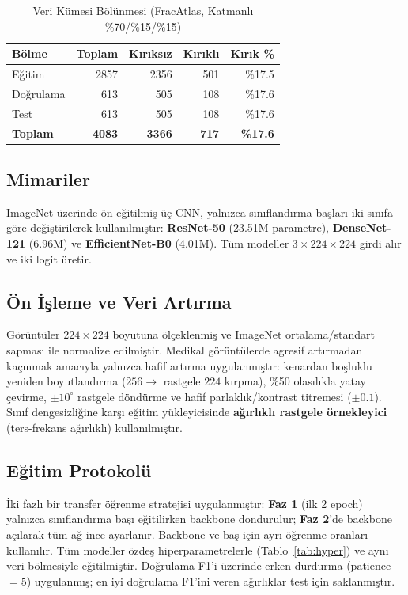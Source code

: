 \documentclass[conference]{IEEEtran}
\begin{document}
\begin{table}[t]
\caption{Veri Kümesi Bölünmesi (FracAtlas, Katmanlı \%70/\%15/\%15)}
\label{tab:split}
\centering
\begin{tabular}{lrrrr}
\toprule
\textbf{Bölme} & \textbf{Toplam} & \textbf{Kırıksız} & \textbf{Kırıklı} & \textbf{Kırık \%} \\
\midrule
Eğitim    & 2857 & 2356 & 501 & \%17.5 \\
Doğrulama & 613  & 505  & 108 & \%17.6 \\
Test      & 613  & 505  & 108 & \%17.6 \\
\midrule
\textbf{Toplam} & \textbf{4083} & \textbf{3366} & \textbf{717} & \textbf{\%17.6} \\
\bottomrule
\end{tabular}
\end{table}

\subsection{Mimariler}
ImageNet üzerinde ön-eğitilmiş üç CNN, yalnızca sınıflandırma başları iki sınıfa göre değiştirilerek kullanılmıştır: \textbf{ResNet-50} \cite{resnet} (23.51M parametre), \textbf{DenseNet-121} \cite{densenet} (6.96M) ve \textbf{EfficientNet-B0} \cite{efficientnet} (4.01M). Tüm modeller $3 \times 224 \times 224$ girdi alır ve iki logit üretir.

\subsection{Ön İşleme ve Veri Artırma}
Görüntüler $224 \times 224$ boyutuna ölçeklenmiş ve ImageNet ortalama/standart sapması ile normalize edilmiştir. Medikal görüntülerde agresif artırmadan kaçınmak amacıyla yalnızca hafif artırma uygulanmıştır: kenardan boşluklu yeniden boyutlandırma ($256 \to$ rastgele $224$ kırpma), \%50 olasılıkla yatay çevirme, $\pm 10^{\circ}$ rastgele döndürme ve hafif parlaklık/kontrast titremesi ($\pm 0.1$). Sınıf dengesizliğine karşı eğitim yükleyicisinde \textbf{ağırlıklı rastgele örnekleyici} (ters-frekans ağırlıklı) kullanılmıştır.

\subsection{Eğitim Protokolü}
İki fazlı bir transfer öğrenme stratejisi uygulanmıştır: \textbf{Faz 1} (ilk 2 epoch) yalnızca sınıflandırma başı eğitilirken backbone dondurulur; \textbf{Faz 2}'de backbone açılarak tüm ağ ince ayarlanır. Backbone ve baş için ayrı öğrenme oranları kullanılır. Tüm modeller özdeş hiperparametrelerle (Tablo~\ref{tab:hyper}) ve aynı veri bölmesiyle eğitilmiştir. Doğrulama F1'i üzerinde erken durdurma (patience $= 5$) uygulanmış; en iyi doğrulama F1'ini veren ağırlıklar test için saklanmıştır.
\end{document}
